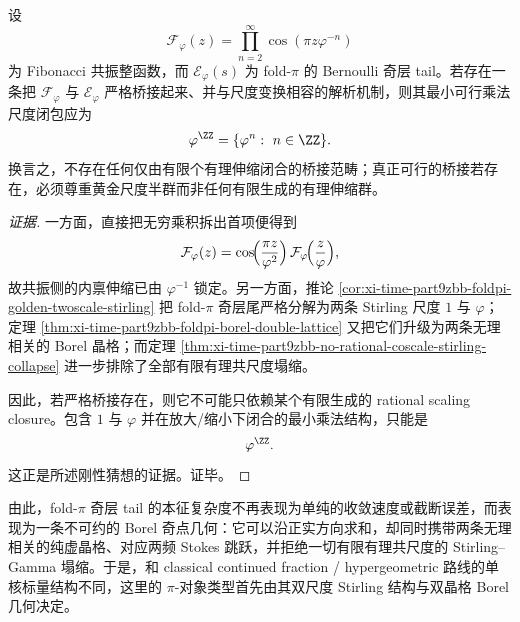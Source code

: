 \begin{conjecture}[黄金尺度半群的桥接刚性]\label{conj:xi-time-part9zbb-golden-scale-semigroup-rigidity}
设
\[
\mathcal F_\varphi(z)=\prod_{n=2}^{\infty}\cos(\pi z\varphi^{-n})
\]
为 Fibonacci 共振整函数，而 \(\mathcal E_\varphi(s)\) 为 fold-\(\pi\) 的 Bernoulli 奇层 tail。若存在一条把 \(\mathcal F_\varphi\) 与 \(\mathcal E_\varphi\) 严格桥接起来、并与尺度变换相容的解析机制，则其最小可行乘法尺度闭包应为
\[
\varphi^{\ZZ}=\{\varphi^n:\ n\in\ZZ\}.
\]
换言之，不存在任何仅由有限个有理伸缩闭合的桥接范畴；真正可行的桥接若存在，必须尊重黄金尺度半群而非任何有限生成的有理伸缩群。
\end{conjecture}
\begin{proof}[证据]
一方面，直接把无穷乘积拆出首项便得到
\[
\mathcal F_\varphi(z)
=
\cos\!\Bigl(\frac{\pi z}{\varphi^2}\Bigr)\,
\mathcal F_\varphi\!\Bigl(\frac{z}{\varphi}\Bigr),
\]
故共振侧的内禀伸缩已由 \(\varphi^{-1}\) 锁定。另一方面，推论
\ref{cor:xi-time-part9zbb-foldpi-golden-twoscale-stirling}
把 fold-\(\pi\) 奇层尾严格分解为两条 Stirling 尺度 \(1\) 与 \(\varphi\)；定理
\ref{thm:xi-time-part9zbb-foldpi-borel-double-lattice}
又把它们升级为两条无理相关的 Borel 晶格；而定理
\ref{thm:xi-time-part9zbb-no-rational-coscale-stirling-collapse}
进一步排除了全部有限有理共尺度塌缩。

因此，若严格桥接存在，则它不可能只依赖某个有限生成的 rational scaling closure。包含 \(1\) 与 \(\varphi\) 并在放大/缩小下闭合的最小乘法结构，只能是
\[
\varphi^{\ZZ}.
\]
这正是所述刚性猜想的证据。证毕。
\end{proof}

\noindent
由此，fold-\(\pi\) 奇层 tail 的本征复杂度不再表现为单纯的收敛速度或截断误差，而表现为一条不可约的 Borel 奇点几何：它可以沿正实方向求和，却同时携带两条无理相关的纯虚晶格、对应两频 Stokes 跳跃，并拒绝一切有限有理共尺度的 Stirling--Gamma 塌缩。于是，和 classical continued fraction / hypergeometric 路线的单核标量结构不同，这里的 \(\pi\)-对象类型首先由其双尺度 Stirling 结构与双晶格 Borel 几何决定。

\endinput
